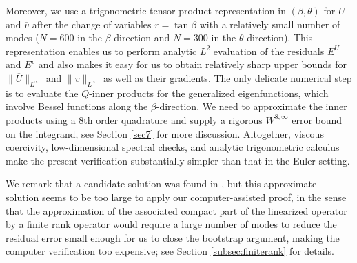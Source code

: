 \documentclass[11pt,a4paper]{article}
\numberwithin{equation}{section}
\begin{document}
Moreover, we use a trigonometric tensor-product representation in $(\beta,\theta)$ for $\overline{U}$ and $\overline{v}$ after the change of variables
$r=\tan\beta$ with a relatively small number of modes ($N=600$ in the $\beta$-direction and $N=300$ in the $\theta$-direction). This representation enables us to perform
analytic $L^2$ evaluation of the residuals $E^U$ and $E^v$ and also makes it easy for us to obtain relatively sharp upper bounds for $\|\overline{U}\|_{L^\infty}$ and $\|\overline{v}\|_{L^\infty}$ as well as their gradients. The only
delicate numerical step is to evaluate the $Q$-inner products for the generalized eigenfunctions, which involve Bessel functions along the $\beta$-direction. We need to approximate the inner products using a 8th order quadrature and supply a rigorous $W^{8,\infty}$ error bound on the integrand, see Section \ref{sec7} for more discussion. Altogether, viscous coercivity, low-dimensional spectral checks, and
analytic trigonometric calculus make the present verification substantially simpler than that in the
Euler setting.

We remark that a candidate solution was found in \cite{guillod2023numerical}, but this approximate solution seems to be too
large to apply our computer-assisted proof,  in the sense that the approximation of the associated compact part of the linearized operator by a finite rank operator would require a large number of modes to reduce the residual error small enough for us to close the bootstrap argument, making the computer verification too expensive; see Section \ref{subsec:finiterank} for details.  
\end{document}
